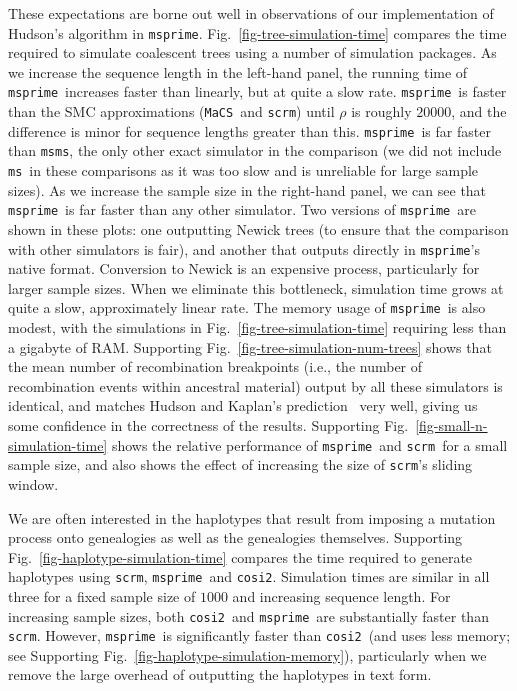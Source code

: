 \documentclass[10pt,letterpaper]{article}
\newcommand{\ms}[0]{\texttt{ms}}
\newcommand{\msms}[0]{\texttt{msms}}
\newcommand{\msprime}[0]{\texttt{msprime}}
\newcommand{\scrm}[0]{\texttt{scrm}}
\newcommand{\cosi}[0]{\texttt{cosi2}}
\newcommand{\MaCS}[0]{\texttt{MaCS}}
\begin{document}
These expectations are borne out well in observations of our implementation of
Hudson's algorithm in \msprime. Fig.~\ref{fig-tree-simulation-time} compares
the time required to simulate coalescent trees using a number of simulation
packages. As we increase the sequence length in the left-hand panel, the
running time of \msprime\ increases faster than linearly, but at quite a slow
rate. \msprime\ is faster than the SMC approximations (\MaCS\ and \scrm) until
$\rho$ is roughly $20000$, and the difference is minor for sequence lengths
greater than this. \msprime\ is far faster than \msms, the only other exact
simulator in the comparison (we did not include \ms\ in these comparisons as it
was too slow and is unreliable for large sample sizes). As we increase the
sample size in the right-hand panel, we can see that \msprime\ is far faster
than any other simulator. Two versions of \msprime\ are shown in these plots:
one outputting Newick trees (to ensure that the comparison with other
simulators is fair), and another that outputs directly in \msprime's native
format. Conversion to Newick is an expensive process, particularly for larger
sample sizes.  When we eliminate this bottleneck, simulation time grows
at quite a slow, approximately linear rate. The memory usage of \msprime\ is also
modest, with the simulations in Fig.~\ref{fig-tree-simulation-time} requiring
less than a gigabyte of RAM. Supporting Fig.~\ref{fig-tree-simulation-num-trees} shows
that the mean number of recombination breakpoints (i.e., the number
of recombination events within ancestral material) output by all these
simulators is identical, and matches Hudson and Kaplan's
prediction~\citep{hk85} very well, giving us some confidence in the correctness of the
results. Supporting Fig.~\ref{fig-small-n-simulation-time} shows the relative
performance of \msprime\ and \scrm\ for a small sample size, and also shows the
effect of increasing the size of \scrm's sliding window.

We are often interested in the haplotypes that result from imposing a mutation
process onto genealogies as well as the genealogies themselves. Supporting
Fig.~\ref{fig-haplotype-simulation-time} compares the time required to
generate haplotypes using \scrm, \msprime\ and \cosi. Simulation times are
similar in all three for a fixed sample size of $1000$ and increasing sequence
length. For increasing sample sizes, both \cosi\ and \msprime\ are
substantially faster than \scrm. However, \msprime\ is significantly faster
than \cosi\ (and uses less memory; see Supporting
Fig.~\ref{fig-haplotype-simulation-memory}), particularly when we remove the
large overhead of outputting the haplotypes in text form.
\end{document}
